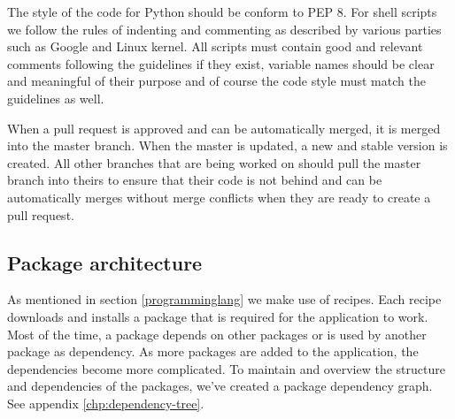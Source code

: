 The style of the code for Python should be conform to PEP 8. For shell scripts we follow the rules of indenting and commenting as described by various parties such as Google and Linux kernel.
All scripts must contain good and relevant comments following the guidelines if they exist, variable names should be clear and meaningful of their purpose and of course the code style must match the guidelines as well.

When a pull request is approved and can be automatically merged, it is merged into the master branch. When the master is updated, a new and stable version is created. All other branches that are being worked on should pull the master branch into theirs to ensure that their code is not behind and can be automatically merges without merge conflicts when they are ready to create a pull request.

\subsection{Package architecture}
As mentioned in section \ref{programminglang} we make use of recipes. Each recipe downloads and installs a package that is required for the application to work. Most of the time, a package depends on other packages or is used by another package as dependency. As more packages are added to the application, the dependencies become more complicated.
To maintain and overview the structure and dependencies of the packages, we've created a package dependency graph. See appendix \ref{chp:dependency-tree}.